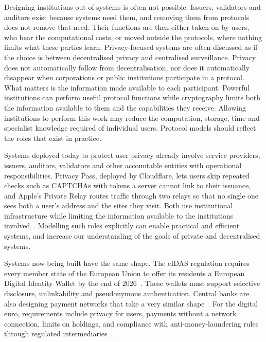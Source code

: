 Designing institutions out of systems is often not possible. Issuers,
validators and auditors exist because systems need them, and removing them from
protocols does not remove that need. Their functions are then either taken on
by users, who bear the computational costs, or moved outside the protocols,
where nothing limits what these parties learn. Privacy-focused systems are
often discussed as if the choice is between decentralised privacy and
centralised surveillance. Privacy does not automatically follow from
decentralisation, nor does it automatically disappear when corporations or
public institutions participate in a protocol. What matters is the information
made available to each participant. Powerful institutions can perform useful
protocol functions while cryptography limits both the information available to
them and the capabilities they receive. Allowing institutions to perform this
work may reduce the computation, storage, time and specialist knowledge
required of individual users. Protocol models should reflect the roles that
exist in practice.

Systems deployed today to protect user privacy already involve service
providers, issuers, auditors, validators and other accountable entities with
operational responsibilities. Privacy Pass, deployed by Cloudflare, lets users
skip repeated checks such as CAPTCHAs with tokens a server cannot link to their
issuance, and Apple's Private Relay routes traffic through two relays so that
no single one sees both a user's address and the sites they visit. Both use
institutional infrastructure while limiting the information available to the
institutions involved~\cite{PoPETS:DGSTV18,privaterelay2021}.  Modelling such
roles explicitly can enable practical and efficient systems, and increase our
understanding of the goals of private and decentralised systems.

Systems now being built have the same shape. The eIDAS regulation requires
every member state of the European Union to offer its residents a European
Digital Identity Wallet by the end of 2026~\cite{eIDAS2024}. These wallets must
support selective disclosure, unlinkability and pseudonymous authentication.
Central banks are also designing payment networks that take a very similar
shape~\cite{cbdctracker}. For the digital euro, requirements include privacy
for users, payments without a network connection, limits on holdings, and
compliance with anti-money-laundering rules through regulated
intermediaries~\cite{digitaleuro2023}.

